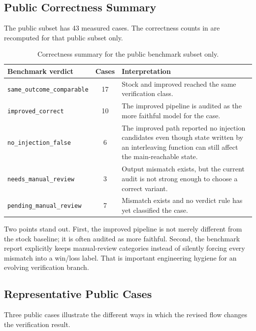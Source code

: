 \subsection{Public Correctness Summary}

The public subset has 43 measured cases. The correctness counts in
 are recomputed for that public subset only.

\begin{table}[t]
  \centering
  \small
  \begin{tabularx}{\linewidth}{@{}l c X@{}}
    \toprule
    Benchmark verdict & Cases & Interpretation \\
    \midrule
    \texttt{same\_outcome\_comparable} & 17 & Stock and improved reached the same
    verification class. \\
    \texttt{improved\_correct} & 10 & The improved pipeline is audited as the more faithful
    model for the case. \\
    \texttt{no\_injection\_false} & 6 & The improved path reported no injection candidates
    even though state written by an interleaving function can still affect the main-reachable
    state. \\
    \texttt{needs\_manual\_review} & 3 & Output mismatch exists, but the current audit is not
    strong enough to choose a correct variant. \\
    \texttt{pending\_manual\_review} & 7 & Mismatch exists and no verdict rule has yet
    classified the case. \\
    \bottomrule
  \end{tabularx}
  \caption{Correctness summary for the public benchmark subset only.}
  \label{tab:benchmark-summary}
\end{table}

Two points stand out. First, the improved pipeline is not merely different from the stock
baseline; it is often audited as more faithful. Second, the benchmark report explicitly keeps
manual-review categories instead of silently forcing every mismatch into a win/loss label. That
is important engineering hygiene for an evolving verification branch.

\subsection{Representative Public Cases}

Three public cases illustrate the different ways in which the revised flow changes the
verification result.

